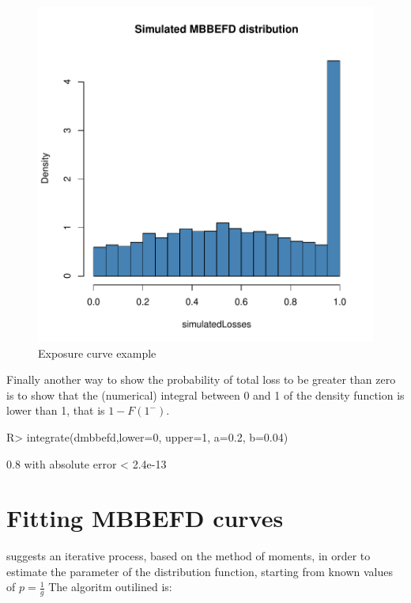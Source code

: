\documentclass[nojss]{jss}
\begin{document}
\begin{figure}
\begin{center}
\includegraphics{mbbefd-distrPlot}
\caption{Exposure curve example}
\label{fig:G1}
\end{center}
\end{figure}




Finally another way to show the probability of total loss to be greater than zero is to show that the (numerical) integral between 0 and 1 of the density function is lower than 1, that is $1-F\left(1^- \right)$.

\begin{Schunk}
\begin{Sinput}
R> integrate(dmbbefd,lower=0, upper=1, a=0.2, b=0.04)
\end{Sinput}
\begin{Soutput}
0.8 with absolute error < 2.4e-13
\end{Soutput}
\end{Schunk}


\section{Fitting MBBEFD curves}\label{sec:fitting}


\cite{Bernegger} suggests an iterative process, based on the method of moments, in order to estimate the parameter of the 
distribution function, starting from known values of $p=\frac{1}{g}$ The algoritm outilined is:
\end{document}
